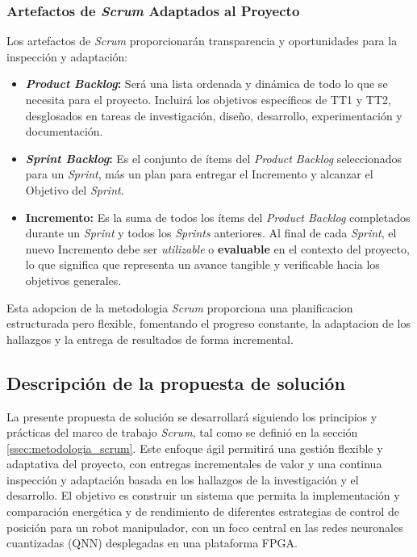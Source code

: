 \documentclass[12pt]{article}
\begin{document}
\subsubsection{Artefactos de \textit{Scrum} Adaptados al Proyecto}
\label{sssec:artefactos_scrum_proyecto}
Los artefactos de \textit{Scrum} proporcionarán transparencia y oportunidades para la inspección y adaptación:
\begin{itemize}
    \item \textbf{\textit{Product Backlog}:} Será una lista ordenada y dinámica de todo lo que se necesita para el proyecto. Incluirá los objetivos específicos de TT1 y TT2, desglosados en tareas de investigación, diseño, desarrollo, experimentación y documentación.
    \item \textbf{\textit{Sprint Backlog}:} Es el conjunto de ítems del \textit{Product Backlog} seleccionados para un \textit{Sprint}, más un plan para entregar el Incremento y alcanzar el Objetivo del \textit{Sprint}.
    \item \textbf{Incremento:} Es la suma de todos los ítems del \textit{Product Backlog} completados durante un \textit{Sprint} y todos los \textit{Sprints} anteriores. Al final de cada \textit{Sprint}, el nuevo Incremento debe ser \textit{utilizable} o \textbf{evaluable} en el contexto del proyecto, lo que significa que representa un avance tangible y verificable hacia los objetivos generales.
\end{itemize}
Esta adopcion de la metodologia \textit{Scrum} proporciona una planificacion estructurada pero flexible, fomentando el progreso constante, la adaptacion de los hallazgos y la entrega de resultados de forma incremental.

\subsection{Descripción de la propuesta de solución}
\label{ssec:descripcion_propuesta_solucion_scrum}

La presente propuesta de solución se desarrollará siguiendo los principios y prácticas del marco de trabajo \textit{Scrum}, tal como se definió en la sección \ref{ssec:metodologia_scrum}. Este enfoque ágil permitirá una gestión flexible y adaptativa del proyecto, con entregas incrementales de valor y una continua inspección y adaptación basada en los hallazgos de la investigación y el desarrollo. El objetivo es construir un sistema que permita la implementación y comparación energética y de rendimiento de diferentes estrategias de control de posición para un robot manipulador, con un foco central en las redes neuronales cuantizadas (QNN) desplegadas en una plataforma FPGA.
\end{document}
